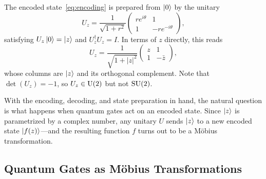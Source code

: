 The encoded state~\eqref{eq:encoding} is prepared from
$\ket{0}$ by the unitary
\begin{equation}
	U_z = \frac{1}{\sqrt{1+r^2}}\!\begin{pmatrix}
		re^{i\theta} & 1 \\ 1 & -re^{-i\theta}
	\end{pmatrix},
	\label{eq:encoding-unitary}
\end{equation}
satisfying $U_z\ket{0} = \ket{z}$ and $U_z^\dagger U_z = I$.
In terms of $z$ directly, this reads
\begin{equation}
	U_z = \frac{1}{\sqrt{1+|z|^2}}
	\begin{pmatrix} z & 1 \\ 1 & -\bar{z}\end{pmatrix},
	\label{eq:encoding-unitary-compact}
\end{equation}
whose columns are $\ket{z}$ and its orthogonal complement.  Note
that $\det(U_z) = -1$, so $U_z \in \mathrm{U}(2)$ but not $\mathrm{SU}(2)$.

With the encoding, decoding, and state preparation in hand, the
natural question is what happens when quantum gates act on an
encoded state.  Since $\ket{z}$ is parametrized by a complex
number, any unitary $U$ sends $\ket{z}$ to a new encoded state
$\ket{f(z)}$---and the resulting function $f$ turns out to be a
M\"obius transformation.

\subsection{Quantum Gates as M\"obius Transformations}
\label{subsec:mobius}

